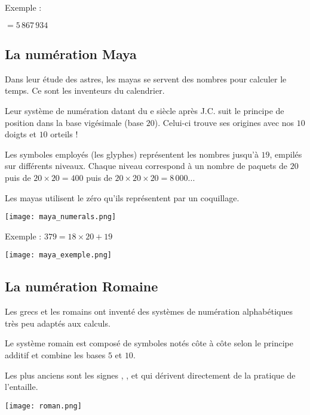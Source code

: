 \begin{pageCours}
\begin{His}
Exemple :

\begin{center}
$=5\,867\,934$
\end{center}
\end{His}

\subsection{La numération Maya}

\begin{His}
Dans leur étude des astres, les mayas se servent des nombres pour calculer le temps. Ce sont les inventeurs du calendrier.

 Leur système de numération datant du e siècle après J.C. suit le principe de position dans la base vigésimale (base $20$). Celui-ci trouve ses origines avec nos $10$ doigts et $10$ orteils !  
 
 Les symboles employés (les glyphes) représentent les nombres jusqu'à $19$, empilés sur différents niveaux. Chaque niveau correspond à un nombre de paquets de $20$ puis de $20\times20=400$ puis de $20\times20\times20=8\,000$...
 
Les mayas utilisent le zéro qu'ils représentent par un coquillage.

\begin{center}
\texttt{[image: maya\_numerals.png]}
\end{center}

Exemple : $379=18\times20+19$
\begin{center}
\texttt{[image: maya\_exemple.png]}
\end{center}
\end{His}

\subsection{La numération Romaine}

\begin{His}
Les grecs et les romains ont inventé des systèmes de numération alphabétiques très peu adaptés aux calculs.

Le système romain est composé de symboles notés côte à côte selon le principe additif et combine les bases $5$ et $10$.

Les plus anciens sont les signes , , et  qui dérivent directement de la pratique de l'entaille.

\begin{center}
\texttt{[image: roman.png]}
\end{center}


\end{His}
\end{pageCours}

